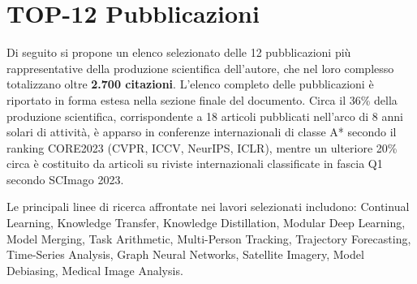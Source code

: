 \nocite{*}

\renewcommand{\cvbibprefix}{}
\renewcommand{\cvbibsuffix}{a}

\section{TOP-12 Pubblicazioni}
%
Di seguito si propone un elenco selezionato delle 12 pubblicazioni più rappresentative della produzione scientifica dell’autore, che nel loro complesso totalizzano oltre \textbf{2.700 citazioni}. L’elenco completo delle pubblicazioni è riportato in forma estesa nella sezione finale del documento. Circa il 36\% della produzione scientifica, corrispondente a 18 articoli pubblicati nell’arco di 8 anni solari di attività, è apparso in conferenze internazionali di classe A* secondo il ranking CORE2023 (CVPR, ICCV, NeurIPS, ICLR), mentre un ulteriore 20\% circa è costituito da articoli su riviste internazionali classificate in fascia Q1 secondo SCImago 2023.

\vspace{0.5em}
Le principali linee di ricerca affrontate nei lavori selezionati includono: Continual Learning, Knowledge Transfer, Knowledge Distillation, Modular Deep Learning, Model Merging, Task Arithmetic, Multi-Person Tracking, Trajectory Forecasting, Time-Series Analysis, Graph Neural Networks, Satellite Imagery, Model Debiasing, Medical Image Analysis.

{
\small
\printbibliography[keyword=top, heading=none]
}